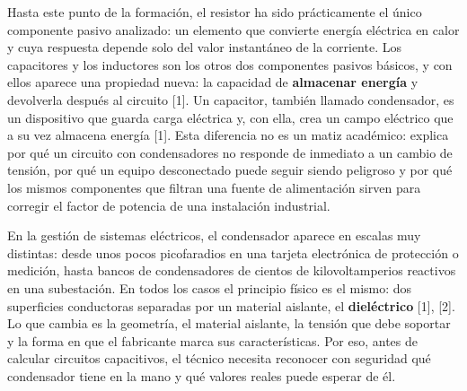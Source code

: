 \documentclass[11pt,letterpaper]{article}
\begin{document}
Hasta este punto de la formación, el resistor ha sido prácticamente el único componente pasivo analizado: un elemento que convierte energía eléctrica en calor y cuya respuesta depende solo del valor instantáneo de la corriente. Los capacitores y los inductores son los otros dos componentes pasivos básicos, y con ellos aparece una propiedad nueva: la capacidad de \textbf{almacenar energía} y devolverla después al circuito [1]. Un capacitor, también llamado condensador, es un dispositivo que guarda carga eléctrica y, con ella, crea un campo eléctrico que a su vez almacena energía [1]. Esta diferencia no es un matiz académico: explica por qué un circuito con condensadores no responde de inmediato a un cambio de tensión, por qué un equipo desconectado puede seguir siendo peligroso y por qué los mismos componentes que filtran una fuente de alimentación sirven para corregir el factor de potencia de una instalación industrial.

En la gestión de sistemas eléctricos, el condensador aparece en escalas muy distintas: desde unos pocos picofaradios en una tarjeta electrónica de protección o medición, hasta bancos de condensadores de cientos de kilovoltamperios reactivos en una subestación. En todos los casos el principio físico es el mismo: dos superficies conductoras separadas por un material aislante, el \textbf{dieléctrico} [1], [2]. Lo que cambia es la geometría, el material aislante, la tensión que debe soportar y la forma en que el fabricante marca sus características. Por eso, antes de calcular circuitos capacitivos, el técnico necesita reconocer con seguridad qué condensador tiene en la mano y qué valores reales puede esperar de él.
\end{document}

